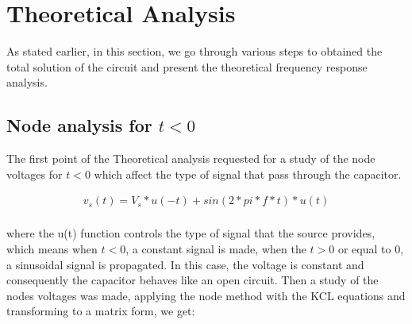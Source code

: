 \section{Theoretical Analysis}
\label{sec:analysis}

\par As stated earlier, in this section, we go through various steps to obtained the total solution of the circuit and present the theoretical frequency response analysis.



\subsection{Node analysis for $t<0$} 

\par The first point of the Theoretical analysis requested for a study of the node voltages for $t<0$ which affect the type of signal that pass through the capacitor. 

\begin{align*}  
v_s(t)=V_s*u(-t)+sin(2*pi*f*t)*u(t)\\   
\end{align*} 

where the u(t) function controls the type of signal that the source provides, which means when $t<0$, a constant signal is made, when the $t>0$ or equal to 0, a sinusoidal signal is propagated.  
In this case, the voltage is constant and consequently the capacitor behaves like an open circuit. Then a study of the nodes voltages was made, applying the node method with the KCL equations and transforming to a matrix form, we get:

